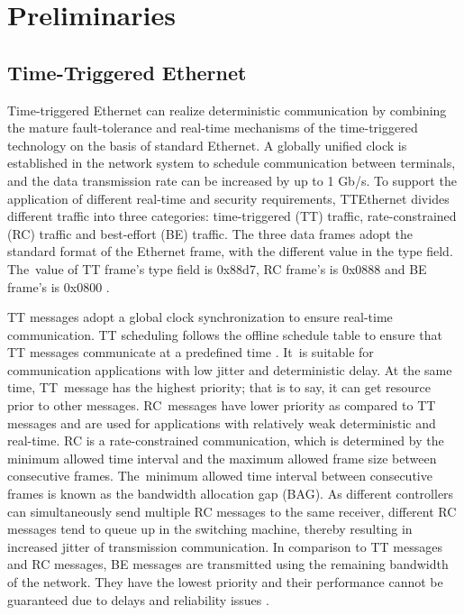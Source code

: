 \documentclass[electronics,article,accept,moreauthors,pdftex]{Definitions/mdpi}
\begin{document}
\section{Preliminaries}\label{Preli}
\unskip
\subsection{Time-Triggered Ethernet}

Time-triggered Ethernet can realize deterministic communication by combining the mature fault-tolerance and real-time mechanisms of the time-triggered technology on the basis of standard Ethernet. A globally unified clock is established in the network system to schedule communication between terminals, and the data transmission rate can be increased by up to 1 Gb/s. To support the application of different real-time and security requirements, TTEthernet divides different traffic into three categories: time-triggered (TT) traffic, rate-constrained (RC) traffic and best-effort (BE) traffic. The three data frames adopt the standard format of the Ethernet frame, with the  different value in the type field. The~value of TT frame's type field is 0x88d7, RC frame's is 0x0888 and BE frame's is 0x0800 \cite{gavriluct2016traffic}.


TT messages adopt a global clock synchronization to ensure real-time communication. TT scheduling follows the offline schedule table to ensure that TT messages communicate at a predefined time \cite{steiner2011automated}. It~is suitable for communication applications with low jitter and deterministic delay. At the same time, TT~message has the highest priority; that is to say, it can get resource prior to other messages. RC~messages have lower priority as compared to TT messages and are used for applications with relatively weak deterministic and real-time. RC is a rate-constrained communication, which is determined by the minimum allowed time interval and the maximum allowed frame size between consecutive frames. The~minimum allowed time interval between consecutive frames is known as the bandwidth allocation gap (BAG). As different controllers can simultaneously send multiple RC messages to the same receiver, different RC messages tend to queue up in the switching machine, thereby resulting in increased jitter of transmission communication. In comparison to TT messages and RC messages, BE messages are transmitted using the remaining bandwidth of the network. They have the lowest priority and their performance cannot be guaranteed due to delays and reliability issues \cite{tamas2012synthesis}.
\end{document}
